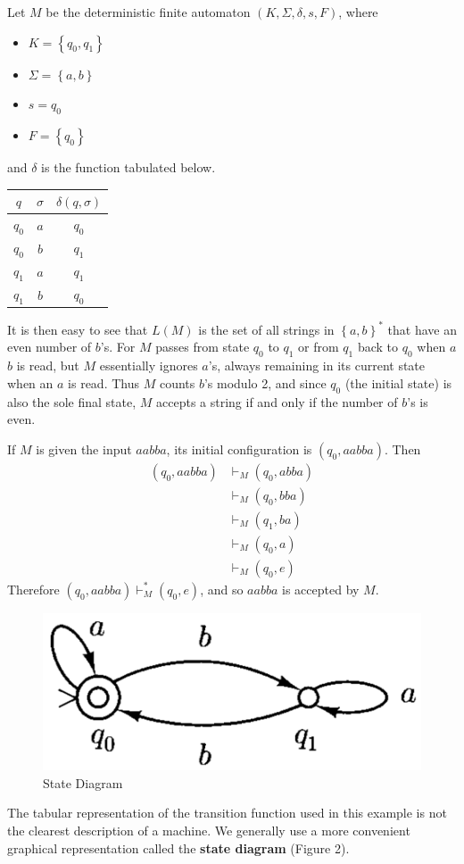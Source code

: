 \begin{example}{}
  Let $M$ be the deterministic finite automaton $(K, \Sigma, \delta, s, F)$, where
  \begin{multicols}{2}
    \begin{itemize}
      \item $K = \left\{ q_0, q_1 \right\}$
      \item $\Sigma = \left\{ a, b \right\}$
      \item $s = q_0$
      \item $F = \left\{ q_0 \right\}$
    \end{itemize}
  \end{multicols}
  and $\delta$ is the function tabulated below.
  \begin{center}
    \begin{tabular}{c|c|c}
      $q$      & $\sigma$ & $\delta(q, \sigma)$  \\ 
      \hline
      $q_0$ & $a$    & $q_0$             \\
      $q_0$ & $b$    & $q_1$             \\
      $q_1$ & $a$    & $q_1$             \\
      $q_1$ & $b$    & $q_0$            
    \end{tabular}
  \end{center}

  It is then easy to see that $L(M)$ is the set of all strings in $\left\{ a, b \right\}^*$ that have an even number of $b$'s. For $M$ passes from state $q_0$ to $q_1$ or from $q_1$ back to $q_0$ when $a$ $b$ is read, but $M$ essentially ignores $a$'s, always remaining in its current state when an $a$ is read. Thus $M$ counts $b$'s modulo 2, and since $q_0$ (the initial state) is also the sole final state, $M$ accepts a string if and only if the number of $b$'s is even.
  
  If $M$ is given the input $aabba$, its initial configuration is $(q_0, aabba)$. Then 
  \begin{align*}
    (q_0, aabba) &\vdash_M (q_0, abba)\\
    &\vdash_M (q_0, bba)\\
    &\vdash_M (q_1, ba)\\
    &\vdash_M (q_0, a)\\
    &\vdash_M (q_0, e)
  \end{align*}
  Therefore $(q_0, aabba) \vdash^*_M (q_0, e)$, and so $aabba$ is accepted by $M$.
\end{example}

\begin{figure}[h!]
  \centering
  \includegraphics[width=.3\textwidth]{img/Fig2.2.png}
  \caption{State Diagram}
\end{figure}
The tabular representation of the transition function used in this example is not the clearest description of a machine. We generally use a more convenient graphical representation called the \textbf{state diagram} (Figure 2).
